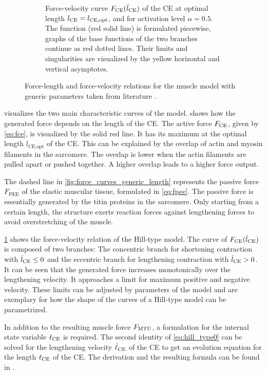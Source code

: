 \begin{figure}
\begin{subfigure}[t]{0.9\textwidth}
    \caption{Force-velocity curve $F_{\text{CE}}(\dot{l}_{\text{CE}})$ of the CE at optimal length $l_{\text{CE}}=l_{\text{CE},\text{opt}}$, and for activation level $\alpha=0.5$. The function (red solid line) is formulated piecewise, graphs of the base functions of the two branches continue as red dotted lines. Their limits and singularities are visualized by the yellow horizontal and vertical asymptotes.}%
    \label{fig:force_curves_generic_velocity}%
  \end{subfigure}%
  \caption{Force-length and force-velocity relations for the muscle model with generic parameters taken from literature \cite{Hilltype2014}.}%
  \label{fig:force_curves_generic}%
\end{figure}%

 visualizes the two main characteristic curves of the model. 
 shows how the generated force depends on the length of the CE. 
The active force $F_{\text{CE}}$, given by \cref{eq:fce}, is visualized by the solid red line. It has its maximum at the optimal length $l_\text{CE,opt}$ of the CE. This can be explained by the overlap of actin and myosin filaments in the sarcomere. The overlap is lower when the actin filaments are pulled apart or pushed together. A higher overlap leads to a higher force output.

The dashed line in \cref{fig:force_curves_generic_length} represents the passive force $F_\text{PEE}$ of the elastic muscular tissue, formulated in \cref{eq:fpee}. The passive force is essentially generated by the titin proteins in the sarcomere. Only starting from a certain length, the structure exerts reaction forces against lengthening forces to avoid overstretching of the muscle.

\cref{fig:force_curves_generic_velocity} shows the force-velocity relation of the Hill-type model. The curve of $F_{\text{CE}}(\dot{l}_{\text{CE}})$ is composed of two branches: 
The concentric branch for shortening contraction with $\dot{l}_{\text{CE}} \leq 0$ and the eccentric branch for lengthening contraction with $\dot{l}_{\text{CE}} > 0$. It can be seen that the generated force increases monotonically over the lengthening velocity. It approaches a limit for maximum positive and negative velocity. These limits can be adjusted by parameters of the model and are exemplary for how the shape of the curves of a Hill-type model can be parametrized.

In addition to the resulting muscle force $F_{\text{MTU}}$, a formulation for the internal state variable $\ell_{\text{CE}}$ is required.
The second identity of \eqref{eq:hill_type0} can be solved for the lengthening velocity $\dot{\ell}_{\text{CE}}$ of the CE to get an evolution equation for the length $\ell_{\text{CE}}$ of the CE. The derivation and the resulting formula can be found in \cite{Hilltype2014}.

